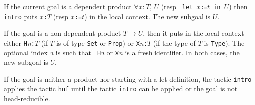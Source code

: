 If the current goal is a dependent product $\forall x:T,~U$ (resp {\tt
let $x$:=$t$ in $U$}) then {\tt intro} puts {\tt $x$:$T$} (resp {\tt $x$:=$t$})
 in the local context.
The new subgoal is $U$.

If the goal is a non-dependent product $T \to U$, then it puts
in the local context either {\tt H}{\it n}{\tt :$T$} (if $T$ is of
type {\tt Set} or {\tt Prop}) or {\tt X}{\it n}{\tt :$T$} (if the type
of $T$ is {\tt Type}). The optional index {\it n} is such that {\tt
H}{\it n} or {\tt X}{\it n} is a fresh identifier.
In both cases, the new subgoal is $U$.

If the goal is neither a product nor starting with a let definition,
the tactic {\tt intro} applies the tactic {\tt hnf} until the tactic
{\tt intro} can be applied or the goal is not head-reducible.

\begin{ErrMsgs}
\item {}
\item {}
\end{ErrMsgs}

